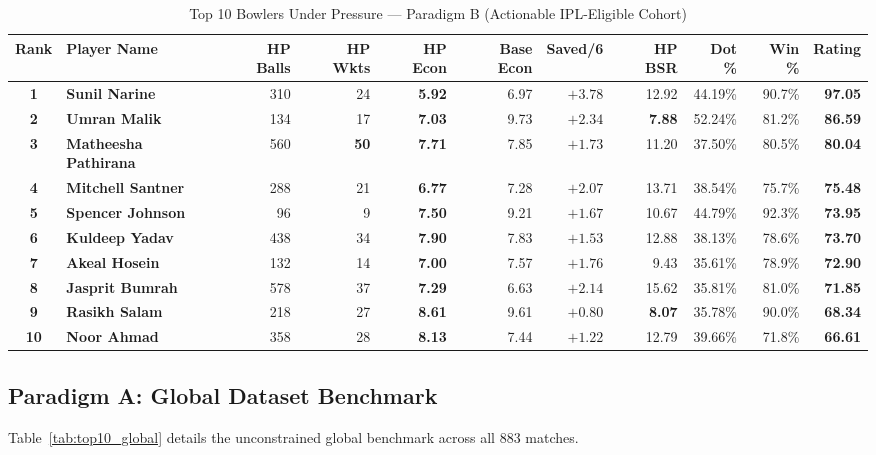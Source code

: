 \documentclass[11pt,a4paper]{article}
\begin{document}
\begin{table}[t]
\centering
\small
\caption{Top 10 Bowlers Under Pressure --- Paradigm B (Actionable IPL-Eligible Cohort)}
\label{tab:top10_bowlers_ipl}
\begin{tabularx}{\textwidth}{c l r r r r r r r r r}
\toprule
\textbf{Rank} & \textbf{Player Name} & \textbf{HP Balls} & \textbf{HP Wkts} & \textbf{HP Econ} & \textbf{Base Econ} & \textbf{Saved/6} & \textbf{HP BSR} & \textbf{Dot \%} & \textbf{Win \%} & \textbf{Rating} \\
\midrule
\textbf{1} & \textbf{Sunil Narine} & 310 & 24 & \textbf{5.92} & 6.97 & $+3.78$ & 12.92 & 44.19\% & 90.7\% & \textbf{97.05} \\
\textbf{2} & \textbf{Umran Malik} & 134 & 17 & \textbf{7.03} & 9.73 & $+2.34$ & \textbf{7.88} & 52.24\% & 81.2\% & \textbf{86.59} \\
\textbf{3} & \textbf{Matheesha Pathirana} & 560 & \textbf{50} & \textbf{7.71} & 7.85 & $+1.73$ & 11.20 & 37.50\% & 80.5\% & \textbf{80.04} \\
\textbf{4} & \textbf{Mitchell Santner} & 288 & 21 & \textbf{6.77} & 7.28 & $+2.07$ & 13.71 & 38.54\% & 75.7\% & \textbf{75.48} \\
\textbf{5} & \textbf{Spencer Johnson} & 96 & 9 & \textbf{7.50} & 9.21 & $+1.67$ & 10.67 & 44.79\% & 92.3\% & \textbf{73.95} \\
\textbf{6} & \textbf{Kuldeep Yadav} & 438 & 34 & \textbf{7.90} & 7.83 & $+1.53$ & 12.88 & 38.13\% & 78.6\% & \textbf{73.70} \\
\textbf{7} & \textbf{Akeal Hosein} & 132 & 14 & \textbf{7.00} & 7.57 & $+1.76$ & 9.43 & 35.61\% & 78.9\% & \textbf{72.90} \\
\textbf{8} & \textbf{Jasprit Bumrah} & 578 & 37 & \textbf{7.29} & 6.63 & $+2.14$ & 15.62 & 35.81\% & 81.0\% & \textbf{71.85} \\
\textbf{9} & \textbf{Rasikh Salam} & 218 & 27 & \textbf{8.61} & 9.61 & $+0.80$ & \textbf{8.07} & 35.78\% & 90.0\% & \textbf{68.34} \\
\textbf{10} & \textbf{Noor Ahmad} & 358 & 28 & \textbf{8.13} & 7.44 & $+1.22$ & 12.79 & 39.66\% & 71.8\% & \textbf{66.61} \\
\bottomrule
\end{tabularx}
\end{table}

\subsection{Paradigm A: Global Dataset Benchmark}
Table~\ref{tab:top10_global} details the unconstrained global benchmark across all 883 matches.
\end{document}
